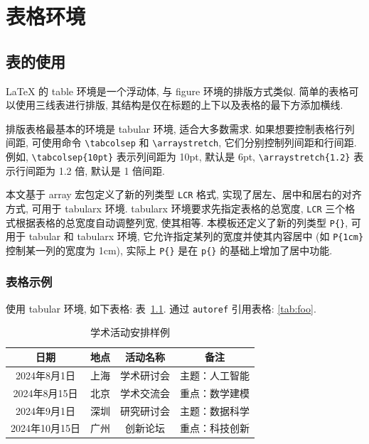 \documentclass[UTF8,openany]{ctexbook}
\numberwithin{equation}{chapter}
\numberwithin{figure}{chapter}
\numberwithin{table}{chapter}
\theoremstyle{mystyle}
\begin{document}

\chapter{表格环境}

\section{表的使用}

LaTeX 的 table 环境是一个浮动体, 与 figure 环境的排版方式类似. 简单的表格可以使用三线表进行排版, 其结构是仅在标题的上下以及表格的最下方添加横线.

排版表格最基本的环境是 tabular 环境, 适合大多数需求. 如果想要控制表格行列间距, 可使用命令 \verb|\tabcolsep| 和 \verb|\arraystretch|, 它们分别控制列间距和行间距. 例如, \verb|\tabcolsep{10pt}| 表示列间距为 10pt, 默认是 6pt,  \verb|\arraystretch{1.2}| 表示行间距为 1.2 倍, 默认是 1 倍间距.

本文基于 array 宏包定义了新的列类型 \verb|LCR| 格式, 实现了居左、居中和居右的对齐方式, 可用于 tabularx 环境. tabularx 环境要求先指定表格的总宽度, \verb|LCR| 三个格式根据表格的总宽度自动调整列宽, 使其相等. 本模板还定义了新的列类型 \verb|P{}|, 可用于 tabular 和 tabularx 环境, 它允许指定某列的宽度并使其内容居中 (如 \verb|P{1cm}| 控制某一列的宽度为 1cm), 实际上 \verb|P{}| 是在 \verb|p{}| 的基础上增加了居中功能.

\subsection{表格示例}

使用 tabular 环境, 如下表格: 表~\ref{tab:foo}. 通过 \verb|autoref| 引用表格: \autoref{tab:foo}.

\begin{table}[htp!]
\centering
\setlength{\tabcolsep}{12pt}  %
\renewcommand{\arraystretch}{1.2}
\caption{学术活动安排样例}
\label{tab:foo}
\begin{tabular}{|c|c|c|c|}
\hline
\textbf{日期}  & \textbf{地点} & \textbf{活动名称} & \textbf{备注} \\ \hline
2024年8月1日      & 上海       & 学术研讨会      & 主题：人工智能 \\ \hline
2024年8月15日    & 北京       & 学术交流会      & 重点：数学建模 \\ \hline
2024年9月1日      & 深圳       & 研究研讨会      & 主题：数据科学 \\ \hline
2024年10月15日  & 广州       & 创新论坛         & 重点：科技创新 \\ \hline
\end{tabular}
\end{table}
\end{document}
